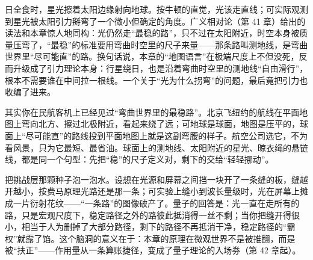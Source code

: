 \begin{thought}
日全食时，星光擦着太阳边缘射向地球。按牛顿的直觉，光该走直线；可实际观测到星光被太阳引力掰弯了一个微小但确定的角度。广义相对论（第 41 章）给出的读法和本章惊人地同构：光仍然走“最稳的路”，只不过在太阳附近，时空本身被质量压弯了，“最稳”的标准要用弯曲时空里的尺子来量——那条路叫测地线，是弯曲世界里“尽可能直”的路。换句话说，本章的“地图语言”在极端尺度上不但没死，反而升级成了引力理论本身：行星绕日，也是沿着弯曲时空里的测地线“自由滑行”，根本不需要谁在中间拉一根线。一个关于“光为什么拐弯”的问题，最后竟把引力也收编了进来。

其实你在民航客机上已经见过“弯曲世界里的最稳路”。北京飞纽约的航线在平面地图上弯向北方、擦过北极附近，看起来绕了远；可地球是球面，地图是压平的，球面上“尽可能直”的路线投到平面地图上就是这副弯腰的样子。航空公司选它，不为看风景，只为它最短、最省油。球面上的测地线、太阳附近的星光、晾衣绳的悬链线，都是同一个句型：先把“稳”的尺子定义对，剩下的交给“轻轻挪动”。
\end{thought}

\begin{thought}[如果光真的同时走所有路]
把挑战层那颗种子泡一泡水。设想在光源和屏幕之间挡一块开了一条缝的板，缝越开越小，按费马原理光路还是那一条；可实验上缝小到波长量级时，光在屏幕上摊成一片衍射花纹——“一条路”的图像破产了。量子的回答是：光一直在走所有的路，只是宏观尺度下，稳定路径之外的路彼此抵消得一丝不剩；当你把缝开得很小，相当于人为删掉了大部分路径，剩下的路径不再抵消干净，稳定路径的“霸权”就露了馅。这个脑洞的意义在于：本章的原理在微观世界不是被推翻，而是被“扶正”——作用量从一条算账捷径，变成了量子理论的入场券（第 42 章起）。
\end{thought}

